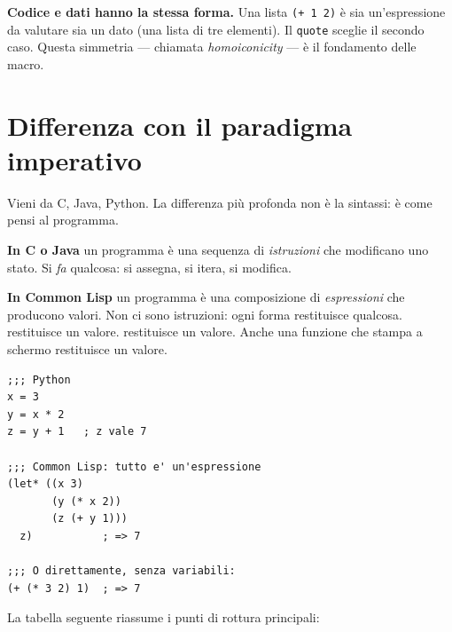 \begin{intuizione}
\textbf{Codice e dati hanno la stessa forma.}
Una lista \texttt{(+ 1 2)} è sia un'espressione da valutare
sia un dato (una lista di tre elementi). Il \texttt{quote} sceglie
il secondo caso. Questa simmetria — chiamata \emph{homoiconicity} —
è il fondamento delle macro.
\end{intuizione}

\section{Differenza con il paradigma imperativo}

Vieni da C, Java, Python. La differenza più profonda non è la sintassi:
è come pensi al programma.

\begin{confronto}
\textbf{In C o Java} un programma è una sequenza di \emph{istruzioni}
che modificano uno stato.
Si \emph{fa} qualcosa: si assegna, si itera, si modifica.

\medskip
\textbf{In Common Lisp} un programma è una composizione di
\emph{espressioni} che producono valori.
Non ci sono istruzioni: ogni forma restituisce qualcosa.
 restituisce un valore.  restituisce un valore.
Anche una funzione che stampa a schermo restituisce un valore.
\end{confronto}

\begin{esempio}
\begin{lstlisting}
;;; Python
x = 3
y = x * 2
z = y + 1   ; z vale 7

;;; Common Lisp: tutto e' un'espressione
(let* ((x 3)
       (y (* x 2))
       (z (+ y 1)))
  z)           ; => 7

;;; O direttamente, senza variabili:
(+ (* 3 2) 1)  ; => 7
\end{lstlisting}
\end{esempio}

La tabella seguente riassume i punti di rottura principali:

